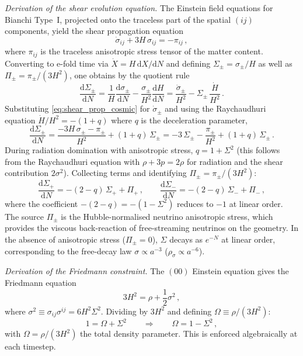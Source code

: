 \documentclass[a4paper,11pt]{article}
\newcommand{\Sig}{\Sigma}
\newcommand{\dd}{\mathrm{d}}
\begin{document}
\textit{Derivation of the shear evolution equation.}  The Einstein field equations for Bianchi Type~I, projected onto the traceless part of the spatial $(ij)$ components, yield the shear propagation equation
\begin{equation}
\dot{\sigma}_{ij} + 3H\,\sigma_{ij} = -\pi_{ij}\,,\label{eq:shear_prop_cosmic}
\end{equation}
where $\pi_{ij}$ is the traceless anisotropic stress tensor of the matter content.  Converting to e-fold time via $\dot{X} = H\,\dd X/\dd N$ and defining $\Sig_\pm = \sigma_\pm / H$ as well as $\Pi_\pm = \pi_\pm / (3H^2)$, one obtains by the quotient rule
\begin{equation}
\frac{\dd\Sig_\pm}{\dd N} = \frac{1}{H}\frac{\dd\sigma_\pm}{\dd N} - \frac{\sigma_\pm}{H^2}\frac{\dd H}{\dd N}
= \frac{\dot{\sigma}_\pm}{H^2} - \Sig_\pm\,\frac{\dot{H}}{H^2}\,.
\end{equation}
Substituting \eqref{eq:shear_prop_cosmic} for $\dot\sigma_\pm$ and using the Raychaudhuri equation $\dot{H}/H^2 = -(1+q)$ where $q$ is the deceleration parameter,
\begin{equation}
\frac{\dd\Sig_\pm}{\dd N} = \frac{-3H\,\sigma_\pm - \pi_\pm}{H^2} + (1+q)\,\Sig_\pm
= -3\,\Sig_\pm - \frac{\pi_\pm}{H^2} + (1+q)\,\Sig_\pm\,.
\end{equation}
During radiation domination with anisotropic stress, $q = 1 + \Sig^2$ (this follows from the Raychaudhuri equation with $\rho + 3p = 2\rho$ for radiation and the shear contribution $2\sigma^2$).  Collecting terms and identifying $\Pi_\pm = \pi_\pm/(3H^2)$:
\begin{equation}
\frac{\dd\Sig_+}{\dd N} = -(2-q)\,\Sig_+ + \Pi_+\,,\qquad
\frac{\dd\Sig_-}{\dd N} = -(2-q)\,\Sig_- + \Pi_-\,,\label{eq:dSig}
\end{equation}
where the coefficient $-(2-q) = -(1-\Sig^2)$ reduces to $-1$ at linear order.  The source $\Pi_\pm$ is the Hubble-normalised neutrino anisotropic stress, which provides the viscous back-reaction of free-streaming neutrinos on the geometry.  In the absence of anisotropic stress ($\Pi_\pm = 0$), $\Sig$ decays as $e^{-N}$ at linear order, corresponding to the free-decay law $\sigma \propto a^{-3}$ ($\rho_\sigma \propto a^{-6}$).

\textit{Derivation of the Friedmann constraint.}  The $(00)$ Einstein equation gives the Friedmann equation
\begin{equation}
3H^2 = \rho + \frac{1}{2}\sigma^2\,,
\end{equation}
where $\sigma^2 \equiv \sigma_{ij}\sigma^{ij} = 6H^2\Sig^2$.  Dividing by $3H^2$ and defining $\Omega \equiv \rho/(3H^2)$:
\begin{equation}
1 = \Omega + \Sig^2\qquad\Longrightarrow\qquad \Omega = 1 - \Sig^2\,,\label{eq:friedmann}
\end{equation}
with $\Omega = \rho/(3H^2)$ the total density parameter.  This is enforced algebraically at each timestep.
\end{document}
